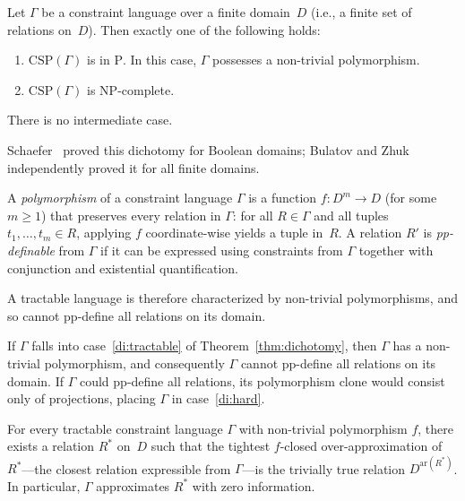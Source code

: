 \documentclass[runningheads]{llncs}
\begin{document}
\begin{theorem}\label{thm:dichotomy}
Let $\Gamma$ be a constraint language over a finite domain~$D$ (i.e., a finite set of relations on~$D$).
Then exactly one of the following holds:
\begin{enumerate}[nosep,label=(\roman*)]
  \item\label{di:tractable} $\mathrm{CSP}(\Gamma)$ is in $\mathrm{P}$.
  In this case, $\Gamma$ possesses a non-trivial polymorphism.
  \item\label{di:hard} $\mathrm{CSP}(\Gamma)$ is $\mathrm{NP}$-complete.
\end{enumerate}
There is no intermediate case.
\end{theorem}

Schaefer~\cite{Schaefer78} proved this dichotomy for Boolean domains; Bulatov and Zhuk independently proved it for all finite domains.

\begin{definition}\label{def:polymorphism}
A \emph{polymorphism} of a constraint language $\Gamma$ is a function $f\colon D^m \to D$ (for some $m \geq 1$) that preserves every relation in $\Gamma$: for all $R \in \Gamma$ and all tuples $t_1, \ldots, t_m \in R$, applying $f$ coordinate-wise yields a tuple in~$R$. A relation $R'$ is \emph{pp-definable} from $\Gamma$ if it can be expressed using constraints from $\Gamma$ together with conjunction and existential quantification.
\end{definition}

A tractable language is therefore characterized by non-trivial polymorphisms, and so cannot pp-define all relations on its domain.

\begin{proposition}\label{prop:algebra}
If $\Gamma$ falls into case~\ref{di:tractable} of Theorem~\ref{thm:dichotomy}, then $\Gamma$ has a non-trivial polymorphism, and consequently $\Gamma$ cannot pp-define all relations on its domain.
If $\Gamma$ could pp-define all relations, its polymorphism clone would consist only of projections, placing $\Gamma$ in case~\ref{di:hard}.
\end{proposition}

\begin{proposition}\label{prop:unapprox-rep}
For every tractable constraint language $\Gamma$ with non-trivial polymorphism $f$, there exists a relation $R^*$ on~$D$ such that the tightest $f$-closed over-approximation of $R^*$---the closest relation expressible from $\Gamma$---is the trivially true relation $D^{\mathrm{ar}(R^*)}$.
In particular, $\Gamma$ approximates $R^*$ with zero information.
\end{proposition}
\end{document}
